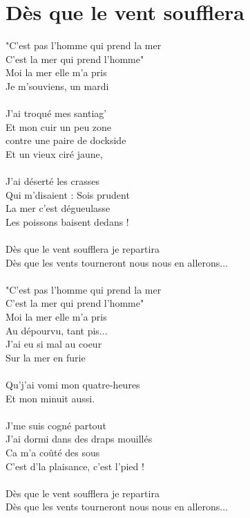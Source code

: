 \section*{Dès que le vent soufflera}
"C'est pas l'homme qui prend la mer\\
C'est la mer qui prend l'homme"\\
Moi la mer elle m'a pris\\
Je m'souviens, un mardi\\\\
J'ai troqué mes santiag'\\
Et mon cuir un peu zone\\
contre une paire de dockside\\
Et un vieux ciré jaune,\\\\
J'ai déserté les crasses\\
Qui m'disaient : Sois prudent\\
La mer c'est dégueulasse\\
Les poissons baisent dedans !\\\\
Dès que le vent soufflera je repartira\\
Dès que les vents tourneront nous nous en allerons...\\\\
"C'est pas l'homme qui prend la mer\\
C'est la mer qui prend l'homme"\\
Moi la mer elle m'a pris\\
Au dépourvu, tant pis...\\
J'ai eu si mal au coeur\\
Sur la mer en furie\\\\
Qu'j'ai vomi mon quatre-heures\\
Et mon minuit aussi.\\\\
J'me suis cogné partout\\
J'ai dormi dans des draps mouillés\\
Ca m'a coûté des sous\\
C'est d'la plaisance, c'est l'pied !\\\\
Dès que le vent soufflera je repartira\\
Dès que les vents tourneront nous nous en allerons...\\\\
